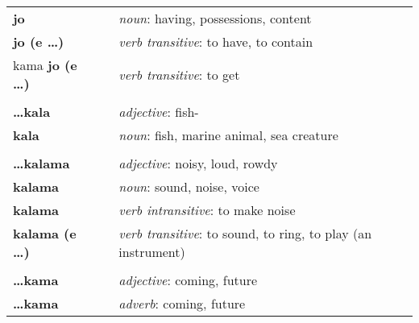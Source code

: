 \begin{supertabular}{p{2,5cm}|ll}
    \textbf{jo}                  &  & \textit{noun}: having, possessions, content                                                                \\
    \textbf{jo (e \dots)}        &  & \textit{verb transitive}: to have, to contain                                                              \\
    kama \textbf{jo (e \dots)}   &  & \textit{verb transitive}: to get                                                                           \\
                                 &  &                                                                                                            \\ %
    \textbf{\dots kala}          &  & \textit{adjective}: fish-                                                                                  \\
    \textbf{kala}                &  & \textit{noun}: fish, marine animal, sea creature                                                           \\
                                 &  &                                                                                                            \\ %
    \textbf{\dots kalama}        &  & \textit{adjective}: noisy, loud, rowdy                                                                     \\
    \textbf{kalama}              &  & \textit{noun}: sound, noise, voice                                                                         \\
    \textbf{kalama}              &  & \textit{verb intransitive}: to make noise                                                                  \\
    \textbf{kalama (e \dots)}    &  & \textit{verb transitive}: to sound, to ring, to play (an instrument)                                       \\
                                 &  &                                                                                                            \\ %
    \textbf{\dots kama}          &  & \textit{adjective}: coming, future                                                                         \\
    \textbf{\dots kama}          &  & \textit{adverb}: coming, future                                                                            \\

\end{supertabular}

